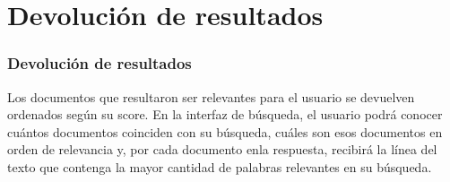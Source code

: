 \documentclass{beamer}
\begin{document}
\section{Devoluci\'on de resultados}
\begin{frame}
    \frametitle{\textbf{Devoluci\'on de resultados}}
    Los documentos que resultaron ser relevantes para el usuario se devuelven ordenados seg\'un su score. En la interfaz de b\'usqueda, el usuario podr\'a conocer cu\'antos documentos coinciden con su b\'usqueda, cu\'ales son esos documentos en orden de relevancia y, por cada documento enla respuesta, recibir\'a la l\'inea del texto que contenga la mayor cantidad de palabras relevantes en su b\'usqueda.
\end{frame}
\end{document}
